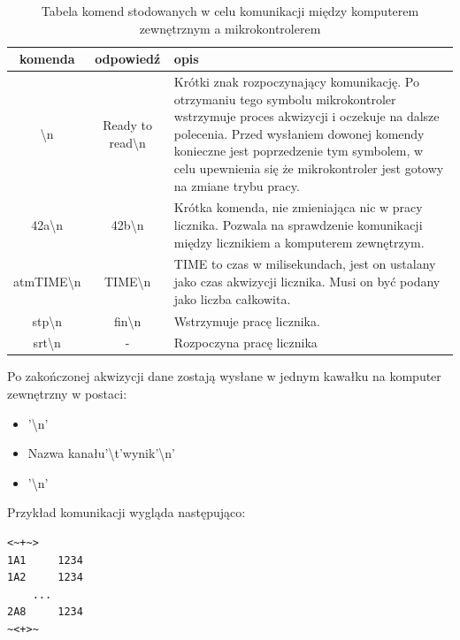 \documentclass[a4paper,12pt]{article}
\begin{document}
\begin{table}
        \centering
        \caption{Tabela komend stodowanych w celu komunikacji między komputerem zewnętrznym a mikrokontrolerem}
        \label{komunikacja}
        \begin{tabularx}{\textwidth}{|c|c|X|}
                \hline
                komenda & odpowiedź & opis \\ \hline

                \textbackslash n & Ready to read\textbackslash n & 
                Krótki znak rozpoczynający komunikację.
                Po otrzymaniu tego symbolu mikrokontroler wstrzymuje proces akwizycji i oczekuje na dalsze polecenia.
                Przed wysłaniem dowonej komendy konieczne jest poprzedzenie tym symbolem, w celu upewnienia się że mikrokontroler jest gotowy na zmiane trybu pracy.
                \\ \hline

                42a\textbackslash n & 42b\textbackslash n& Krótka komenda, nie zmieniająca nic w pracy licznika. Pozwala na sprawdzenie komunikacji między licznikiem a komputerem zewnętrzym. \\ \hline

                atm{TIME}\textbackslash n & TIME\textbackslash n& TIME to czas w milisekundach, jest on ustalany jako czas akwizycji licznika. Musi on być podany jako liczba całkowita.\\ \hline

                stp\textbackslash n& fin\textbackslash n& Wstrzymuje pracę licznika. \\ \hline

                srt\textbackslash n& - & Rozpoczyna pracę licznika \\ \hline

        \end{tabularx}
\end{table}

Po zakończonej akwizycji dane zostają wysłane w jednym kawałku na komputer zewnętrzny w postaci:
\begin{itemize}
        \item \detokenize{<~+~>}'\textbackslash n'
        \item {Nazwa kanału}'\textbackslash t'{wynik}'\textbackslash n'
        \item \detokenize{~<+>~}'\textbackslash n'
\end{itemize}
Przykład komunikacji wygląda następująco:
\begin{lstlisting}
<~+~>
1A1     1234
1A2     1234 
    ...
2A8     1234
~<+>~
\end{lstlisting}
\end{document}
